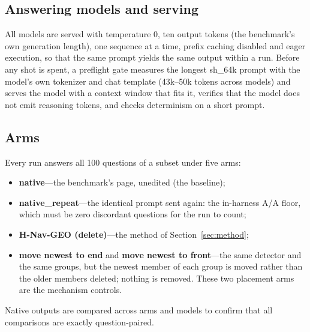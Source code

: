 \documentclass[journal=jcisd8,manuscript=article]{achemso}
\begin{document}
\subsection{Answering models and serving}
\label{sec:models}

\begin{table}[H]\centering
\caption{Answering models. Qwen3-4B-Instruct-2507 is the reference model on which the detector was developed; the other four were added after every parameter was frozen.}
\label{tab:models}\end{table}

All models are served with temperature 0, ten output tokens (the benchmark's own generation length), one sequence at a time, prefix caching disabled and eager execution, so that the same prompt yields the same output within a run. Before any shot is spent, a preflight gate measures the longest sh\_64k prompt with the model's own tokenizer and chat template (43k--50k tokens across models) and serves the model with a context window that fits it, verifies that the model does not emit reasoning tokens, and checks determinism on a short prompt.

\subsection{Arms}

Every run answers all 100 questions of a subset under five arms:
\begin{itemize}
\item \textbf{native}---the benchmark's page, unedited (the baseline);
\item \textbf{native\_repeat}---the identical prompt sent again: the in-harness A/A floor, which must be zero discordant questions for the run to count;
\item \textbf{H-Nav-GEO (delete)}---the method of Section~\ref{sec:method};
\item \textbf{move newest to end} and \textbf{move newest to front}---the same detector and the same groups, but the newest member of each group is moved rather than the older members deleted; nothing is removed. These two placement arms are the mechanism controls.
\end{itemize}
Native outputs are compared across arms and models to confirm that all comparisons are exactly question-paired.
\end{document}
